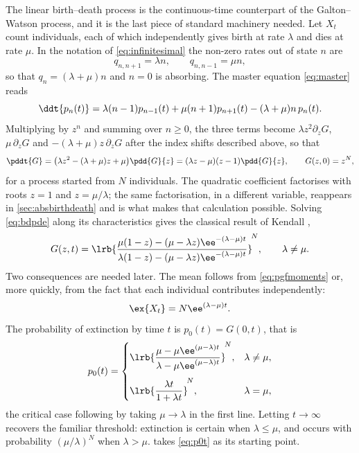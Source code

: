 The linear birth--death process is the continuous-time counterpart of the
Galton--Watson process, and it is the last piece of standard machinery needed.
Let $X_t$ count individuals, each of which independently gives birth at rate
$\lambda$ and dies at rate $\mu$. In the notation of \cref{eq:infinitesimal} the
non-zero rates out of state $n$ are
\begin{equation}
\label{eq:bdrates}
q_{n,n+1} = \lambda n,
\qquad
q_{n,n-1} = \mu n ,
\end{equation}
so that $q_n = (\lambda+\mu)n$ and $n=0$ is absorbing. The master equation
\cref{eq:master} reads
\begin{equation}
\label{eq:bdmaster}
\ddt{p_n(t)} = \lambda(n-1)p_{n-1}(t) + \mu(n+1)p_{n+1}(t) - (\lambda+\mu)n\,p_n(t).
\end{equation}
Multiplying by $z^n$ and summing over $n\ge0$, the three terms become
$\lambda z^2\partial_zG$, $\mu\,\partial_zG$ and $-(\lambda+\mu)z\,\partial_zG$
after the index shifts described above, so that
\begin{equation}
\label{eq:bdpde}
\pddt{G} = \bigl(\lambda z^2 - (\lambda+\mu)z + \mu\bigr)\pdd{G}{z}
= (\lambda z-\mu)(z-1)\pdd{G}{z},
\qquad G(z,0) = z^{N},
\end{equation}
for a process started from $N$ individuals. The quadratic coefficient factorises
with roots $z=1$ and $z=\mu/\lambda$; the same factorisation, in a different
variable, reappears in \cref{sec:absbirthdeath} and is what makes that calculation
possible. Solving \cref{eq:bdpde} along its characteristics gives the classical
result of Kendall \cite{Kendall1948},
\begin{equation}
\label{eq:bdsolution}
G(z,t) = \lrb{\frac{\mu(1-z) - (\mu-\lambda z)\ee^{-(\lambda-\mu)t}}
{\lambda(1-z) - (\mu-\lambda z)\ee^{-(\lambda-\mu)t}}}^{\!N},
\qquad \lambda\neq\mu .
\end{equation}
Two consequences are needed later. The mean follows from
\cref{eq:pgfmoments} or, more quickly, from the fact that each individual
contributes independently:
\begin{equation}
\label{eq:bdmean}
\ex{X_t} = N\ee^{(\lambda-\mu)t}.
\end{equation}
The probability of extinction by time $t$ is $p_0(t) = G(0,t)$, that is
\begin{equation}
\label{eq:p0t}
p_0(t) =
\begin{cases}
\displaystyle\lrb{\frac{\mu-\mu\ee^{(\mu-\lambda)t}}{\lambda-\mu\ee^{(\mu-\lambda)t}}}^{\!N},
& \lambda\neq\mu,\\[14pt]
\displaystyle\lrb{\frac{\lambda t}{1+\lambda t}}^{\!N},
& \lambda=\mu,
\end{cases}
\end{equation}
the critical case following by taking $\mu\to\lambda$ in the first line. Letting
$t\to\infty$ recovers the familiar threshold: extinction is certain when
$\lambda\le\mu$, and occurs with probability $(\mu/\lambda)^N$ when
$\lambda>\mu$.  takes \cref{eq:p0t} as its starting point.
